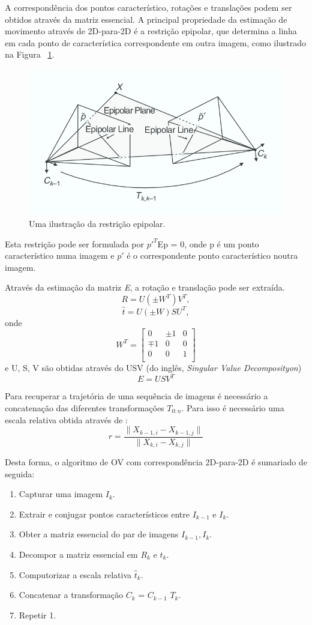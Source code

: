 A correspondência dos pontos característico, rotações e translações podem ser obtidos através da matriz essencial. A principal propriedade da estimação de movimento através de 2D-para-2D é a restrição epipolar, que determina a linha em cada ponto de característica correspondente em outra imagem, como ilustrado na Figura ~\ref{fig:epipolarconstrait}.

\begin{figure}[h!]
	\centering
	\includegraphics[width=0.7\linewidth]{figures/equipolarline}
	\caption{Uma ilustração da restrição epipolar. \cite{VOpart1}}
	\label{fig:epipolarconstrait}
\end{figure}

 Esta restrição pode ser formulada por $p'^{T}$Ep = 0, onde p é um ponto característico numa imagem e $p'$ é o correspondente ponto característico noutra imagem.
 
 Através da estimação da matriz \textit{E}, a rotação e translação pode ser extraída. 
 \[ R = U(\pm W^T)V^T ,\] \[ \hat{t} =  U(\pm W)SU^T, \] 
 onde \[  W^T = \left[\begin{array}{ccc}0&\pm1&0\\\mp1&0&0\\0&0&1\\\end{array}\right] \] 
 e U, S, V são obtidas através do USV (do inglês, \textit{Singular Value Decomposityon}) \[ E = USV^T \]
 
 Para recuperar a trajetória de uma sequência de imagens é necessário a concatenação das diferentes transformações \textit{$T_{0:n}$}. Para isso é necessário uma escala relativa obtida através de : \[ r = \frac{ \| X_{k-1,i} - X_{k-1,j} \| }{ \| X_{k,i} - X_{k,j} \| } \] 
 
Desta forma, o algoritmo de OV com correspondência 2D-para-2D é sumariado de seguida:
\begin{enumerate}
	\item Capturar uma imagem \textit{$I_{k}$}.
	\item Extrair e conjugar pontos característicos entre \textit{$I_{k-1}$} e \textit{$I_{k}$}.
	\item Obter a matriz essencial do par de imagens \textit{$I_{k-1},I_k$}.
	\item Decompor a matriz essencial em \textit{$R_k$} e \textit{$\hat{t}_k$}.
	\item Computorizar a escala relativa \textit{$\hat{t}_k$}.
	\item Concatenar a transformação $C_k$ = $C_{k-1}$ $T_k$.
	\item Repetir 1.
\end{enumerate}


